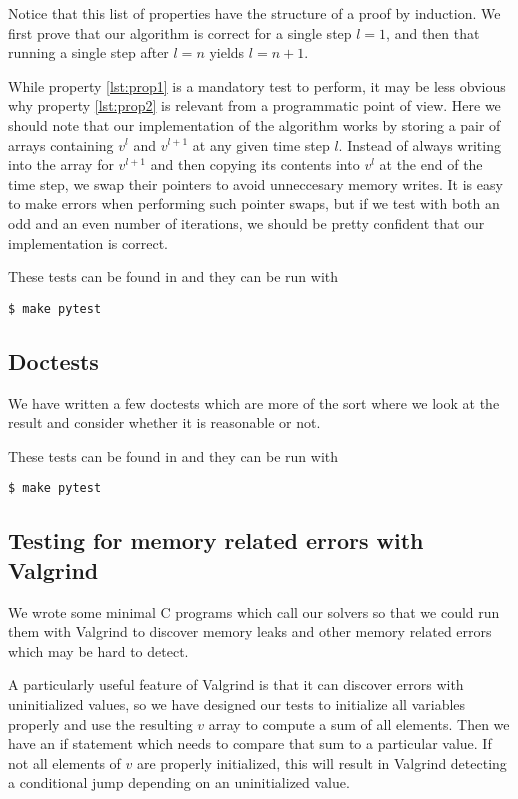 Notice that this list of properties have the structure of a proof by induction. We first prove that our algorithm is correct for a single step $l = 1$, and then that running a single step after $l = n$ yields $l = n+1$.

While property \ref{lst:prop1} is a mandatory test to perform, it may be less obvious why property \ref{lst:prop2} is relevant from a programmatic point of view. Here we should note that our implementation of the algorithm works by storing a pair of arrays containing $v^l$ and $v^{l+1}$ at any given time step $l$. Instead of always writing into the array for $v^{l+1}$ and then copying its contents into $v^l$ at the end of the time step, we swap their pointers to avoid unneccesary memory writes. It is easy to make errors when performing such pointer swaps, but if we test with both an odd and an even number of iterations, we should be pretty confident that our implementation is correct.

These tests can be found in  and they can be run with
\begin{verbatim}
$ make pytest
\end{verbatim}

\subsection{Doctests}
\label{appx:testing:doctests}
We have written a few doctests which are more of the sort where we look at the result and consider whether it is reasonable or not.

These tests can be found in  and they can be run with
\begin{verbatim}
$ make pytest
\end{verbatim}


\subsection{Testing for memory related errors with Valgrind}
\label{appx:testing:valgrind}
We wrote some minimal C programs which call our solvers so that we could run them with Valgrind to discover memory leaks and other memory related errors which may be hard to detect.

A particularly useful feature of Valgrind is that it can discover errors with uninitialized values, so we have designed our tests to initialize all variables properly and use the resulting $v$ array to compute a sum of all elements. Then we have an if statement which needs to compare that sum to a particular value. If not all elements of $v$ are properly initialized, this will result in Valgrind detecting a conditional jump depending on an uninitialized value.


